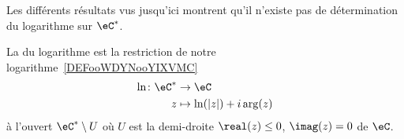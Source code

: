 Les différents résultats vus jusqu'ici montrent qu'il n'existe pas de détermination du logarithme sur \( \eC^*\).

\begin{definition}
	La  du logarithme est la restriction de notre logarithme~\ref{DEFooWDYNooYIXVMC}
	\begin{equation}
		\begin{aligned}
			\ln\colon \eC^* & \to \eC                     \\
			z               & \mapsto \ln(| z |)+i\arg(z)
		\end{aligned}
	\end{equation}
	à l'ouvert \( \eC^*\setminus U\) où \( U\) est la demi-droite \( \real(z)\leq 0\), \( \imag(z)=0\) de \( \eC\).
\end{definition}

